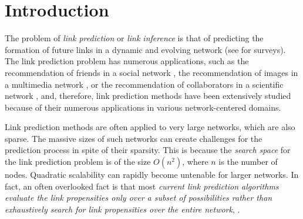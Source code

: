 \section{Introduction}
\label{sec-intro}
The problem of {\em link prediction} or {\em link inference} is that of predicting the formation of future links in a dynamic and
evolving network (see \cite{chancc,linyuan-2011,Hasan-2011} for surveys). The link prediction problem has numerous
applications, such as the recommendation of friends in a social
network \cite{barbieri2014,back,tang2015}, the recommendation of images in a multimedia network \cite{adom}, or
the recommendation of collaborators in a scientific network \cite{kunegis,kleinberg}, and, therefore, link
prediction methods have been extensively studied  because of their numerous applications in various network-centered domains.

Link prediction methods are often applied to very large networks, which are also sparse.  The massive sizes of such networks can
create challenges for the prediction process in spite of their sparsity. This is because the {\em search space} for the link
prediction problem is of the size $O(n^2)$, where $n$ is the number of nodes. Quadratic scalability can rapidly become untenable for
larger networks. In fact, an often overlooked fact is that most {\em current link prediction algorithms evaluate the link
propensities only over a subset of possibilities rather than exhaustively search for link propensities over the entire network}, \eg
\cite{dwang,lee,zhao2016,zhu2016}.

